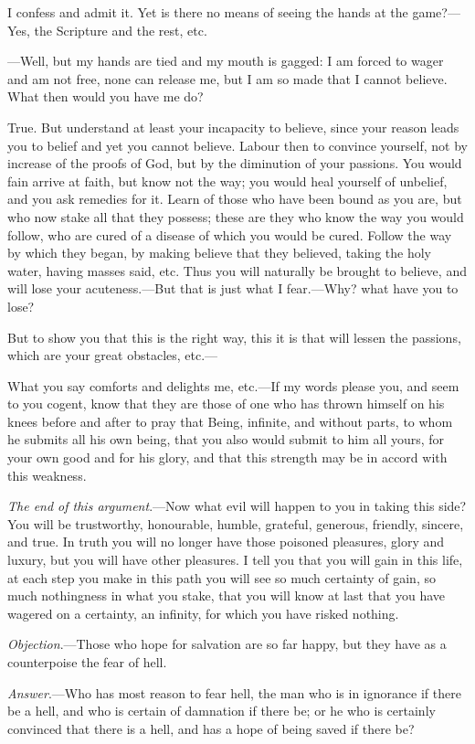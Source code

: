 I confess and admit it. Yet is there no means of seeing the hands at
the game?---Yes, the Scripture and the rest, etc.

---Well, but my hands are tied and my mouth is gagged: I am forced to
wager and am not free, none can release me, but I am so made that I
cannot believe. What then would you have me do?

True. But understand at least your incapacity to believe, since your
reason leads you to belief and yet you cannot  believe. Labour
then to convince yourself, not by increase of the proofs of God, but
by the diminution of your passions. You would fain arrive at faith,
but know not the way; you would heal yourself of unbelief, and you ask
remedies for it. Learn of those who have been bound as you are, but
who now stake all that they possess; these are they who know the way
you would follow, who are cured of a disease of which you would be
cured. Follow the way by which they began, by making believe that they
believed, taking the holy water, having masses said, etc. Thus you
will naturally be brought to believe, and will lose your
acuteness.---But that is just what I fear.---Why? what have you to
lose?

But to show you that this is the right way, this it is that will
lessen the passions, which are your great obstacles, etc.---

What you say comforts and delights me, etc.---If my words please you,
and seem to you cogent, know that they are those of one who has thrown
himself on his knees before and after to pray that Being, infinite,
and without parts, to whom he submits all his own being, that you also
would submit to him all yours, for your own good and for his glory,
and that this strength may be in accord with this weakness.


\textit{The end of this argument}.---Now what evil will happen to you
in taking this side? You will be trustworthy, honourable, humble,
grateful, generous, friendly, sincere, and true. In truth you will no
longer have those poisoned pleasures, glory and luxury, but you will
have other pleasures. I tell you that you will gain in this life, at
each step you make in this path you will see so much certainty of
gain, so much nothingness in what you stake, that you will know at
last that you have wagered on a certainty, an infinity, for which you
have risked nothing.

\vspace{1\baselineskip}


\textit{Objection}.---Those who hope for salvation are so far happy,
but they have as a counterpoise the fear of hell.

\textit{Answer}.---Who has most reason to fear hell, the man who is in
ignorance if there be a hell, and who is certain of damnation if there
be; or he who is certainly convinced  that there is a hell,
and has a hope of being saved if there be?

